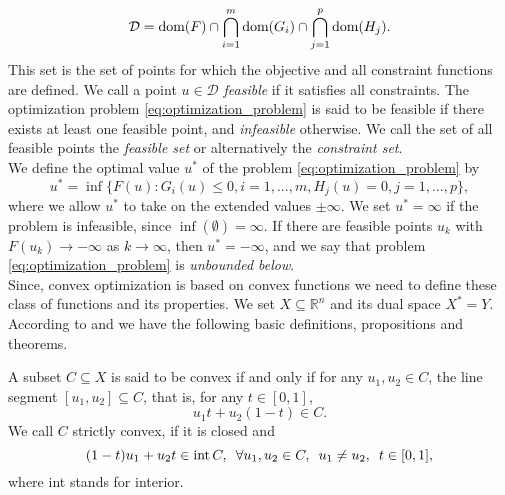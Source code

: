         \begin{equation}
            \mathcal{D} = \textnormal{dom}(F) \cap \bigcap_{i = 1}^{m} \textnormal{dom}(G_{i}) \cap \bigcap_{j = 1}^{p} \textnormal{dom}(H_{j}).
            \label{eq:domain_of_optimization_problem}
        \end{equation}
    This set is the set of points for which the objective and all constraint functions are defined. We call a point $u \in \mathcal{D}$ \textit{feasible} if it satisfies all constraints. The optimization problem \ref{eq:optimization_problem} is said to be feasible if there exists at least one feasible point, and \textit{infeasible} otherwise. We call the set of all feasible points the \textit{feasible set} or alternatively the \textit{constraint set}.\\
    We define the optimal value $u^{\ast}$ of the problem \ref{eq:optimization_problem} by
        \begin{equation}
            u^{\ast} = \inf \big\{ F(u) : G_{i}(u) \le 0, i = 1, ..., m, H_{j}(u) = 0, j = 1, ..., p \big\},
        \end{equation}
    where we allow $u^{\ast}$ to take on the extended values $\pm \infty$. We set $u^{\ast} = \infty$ if the problem is infeasible, since $\inf(\emptyset) = \infty$. If there are feasible points $u_{k}$ with $F(u_{k}) \longrightarrow -\infty$ as $k \longrightarrow \infty$, then $u^{\ast} = -\infty$, and we say that problem \ref{eq:optimization_problem} is \textit{unbounded below}.\\

    Since, convex optimization is based on convex functions we need to define these class of functions and its properties. We set $X \subseteq \mathbb{R}^{n}$ and its dual space $X^{\ast} = Y$. According to \cite{Chambolle-et-al-10} and \cite{Rockafellar} we have the following basic definitions, propositions and theorems.

    \begin{definition} %
    \label{def:convex_set}

        A subset $C \subseteq X$ is said to be convex if and only if for any $u_{1}, u_{2} \in C$, the line segment $[u_{1}, u_{2}] \subseteq C$, that is, for any $t \in [0, 1]$,
            \begin{equation}
                u_{1}t + u_{2}(1 - t) \in C.
                \label{eq:convex_set}
            \end{equation}
        We call $C$ strictly convex, if it is closed and
            \begin{equation}
                (1 - t)u_{1} + u_{2}t \in \textnormal{int}\,C, \,\,\, \forall u_{1}, u_{2} \in C, \,\,\, u_{1} \ne u_{2}, \,\,\, t \in [0, 1],
                \label{eq:strictly_convex_set}
            \end{equation}
        where \textnormal{int} stands for interior.

    \end{definition}

